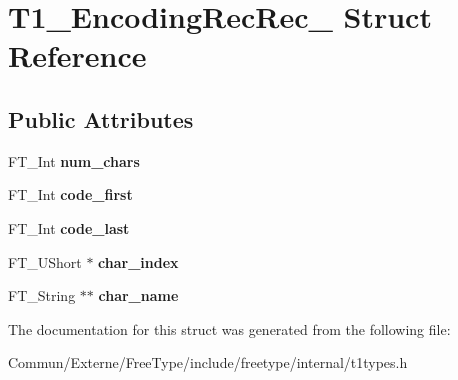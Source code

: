 \hypertarget{struct_t1___encoding_rec_rec__}{}\section{T1\+\_\+\+Encoding\+Rec\+Rec\+\_\+ Struct Reference}
\label{struct_t1___encoding_rec_rec__}
\subsection*{Public Attributes}
\begin{DoxyCompactItemize}
\item 
F\+T\+\_\+\+Int {\bfseries num\+\_\+chars}\hypertarget{struct_t1___encoding_rec_rec___af1468d5bad99cccebeb0387713999e9c}{}\label{struct_t1___encoding_rec_rec___af1468d5bad99cccebeb0387713999e9c}

\item 
F\+T\+\_\+\+Int {\bfseries code\+\_\+first}\hypertarget{struct_t1___encoding_rec_rec___ae21aad8cbb10c8fd94e9f30c60542662}{}\label{struct_t1___encoding_rec_rec___ae21aad8cbb10c8fd94e9f30c60542662}

\item 
F\+T\+\_\+\+Int {\bfseries code\+\_\+last}\hypertarget{struct_t1___encoding_rec_rec___a9be1faadf0ce11d12d3bce600e1f2a9d}{}\label{struct_t1___encoding_rec_rec___a9be1faadf0ce11d12d3bce600e1f2a9d}

\item 
F\+T\+\_\+\+U\+Short $\ast$ {\bfseries char\+\_\+index}\hypertarget{struct_t1___encoding_rec_rec___a0c00a7b5c5ec7ba5eba667252f11f199}{}\label{struct_t1___encoding_rec_rec___a0c00a7b5c5ec7ba5eba667252f11f199}

\item 
F\+T\+\_\+\+String $\ast$$\ast$ {\bfseries char\+\_\+name}\hypertarget{struct_t1___encoding_rec_rec___acf21f77cff90336fb9f297799aaf26eb}{}\label{struct_t1___encoding_rec_rec___acf21f77cff90336fb9f297799aaf26eb}

\end{DoxyCompactItemize}


The documentation for this struct was generated from the following file\+:\begin{DoxyCompactItemize}
\item 
Commun/\+Externe/\+Free\+Type/include/freetype/internal/t1types.\+h\end{DoxyCompactItemize}
